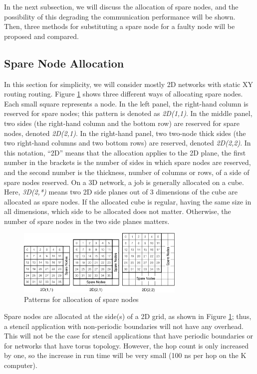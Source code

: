 \documentclass[Afour,times,sageh]{sagej}
\begin{document}
In the next subsection, we will discuss the allocation of spare nodes, and
the possibility of this degrading the communication performance will be
shown. Then, three methods for substituting a spare node for a faulty
node will be proposed and compared.

\subsection{Spare Node Allocation}\label{sec:spare-alloc}

In this section for simplicity, we will consider mostly 2D networks with
static XY routing routing\citep{Zhang:2009:CRX:1603897.1605067}.
Figure \ref{fig:sparenode-allocation} shows three different ways of
allocating spare nodes. Each small square represents a node. In the
left panel, the right-hand column is reserved for spare nodes; this
pattern is denoted as {\it 2D(1,1)}. In the middle panel, two sides
(the right-hand column and the bottom row) are reserved for spare
nodes, denoted {\it 2D(2,1)}. In the right-hand panel, two two-node
thick sides (the two right-hand columns and two bottom rows) are
reserved, denoted {\it 2D(2,2)}. In this notation, ``2D'' means that
the allocation applies to the 2D plane, the first number in the
brackets is the number of sides in which spare nodes are reserved, and
the second number is the thickness, number of columns or rows, of a
side of spare nodes reserved. On a 3D network, a job is generally
allocated on a cube. Here, {\it 3D(2,*)} means two 2D side planes
out of 3 dimensions of the cube are allocated as spare nodes. If the
allocated cube is regular, having the same size in all dimensions,
which side to be allocated does not matter. Otherwise, the number of
spare nodes in the two side planes matters. 

\begin{figure}[ht]
\centering
\includegraphics[width=80mm]{Figs/SpareNodeAllocation.eps}
  \caption{Patterns for allocation of spare nodes }
  \label{fig:sparenode-allocation}
\end{figure}

Spare nodes are allocated at the side(s) of a 2D grid, as shown in
Figure \ref{fig:sparenode-allocation}; thus, a stencil application
with non-periodic boundaries will not have any overhead. This will not
be the case for stencil applications that have periodic boundaries or
for networks that have torus topology. However, the hop count is only
increased by one, so the increase in run time will be very small
(100 ns per hop on the K computer).
\end{document}
